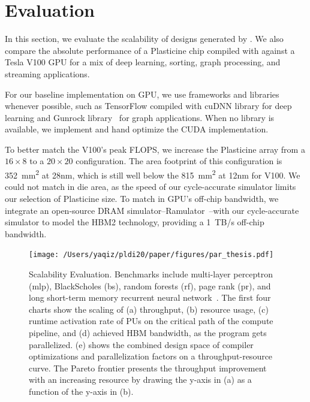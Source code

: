 \section{Evaluation} \label{sec:eval}

In this section, we evaluate the scalability of designs generated by \name.
We also compare the absolute performance of a Plasticine chip compiled with \name against a Tesla V100 GPU 
for a mix of deep learning, sorting, graph processing, and streaming applications.

For our baseline implementation on GPU, we use frameworks and libraries whenever possible, such as TensorFlow compiled
with cuDNN library for deep learning and Gunrock library~\cite{gunrock} for graph applications.
When no library is available, we implement and hand optimize the CUDA implementation.

To better match the V100's peak FLOPS, 
we increase the Plasticine array from a $16\times8$ to a $20\times20$ configuration.
The area footprint of this configuration is \SI{352}{mm^2} at 28nm, which is still well below the 
\SI{815}{mm^2} at 12nm for V100.
We could not match in die area, as the speed of our cycle-accurate simulator limits our selection of Plasticine size.
To match in GPU's off-chip bandwidth, 
we integrate an open-source DRAM simulator--Ramulator~\cite{ramulator}--with our
cycle-accurate simulator to model the HBM2 technology, providing a \SI{1}{TB/s} off-chip bandwidth.

\begin{figure}
\centering
\texttt{[image: /Users/yaqiz/pldi20/paper/figures/par\_thesis.pdf]}
\caption[Scalability Evaluation]{
  Scalability Evaluation. 
  Benchmarks include multi-layer perceptron (mlp), BlackScholes (bs), random forests (rf), page rank
  (pr), and long short-term memory recurrent neural network~\cite{hochreiter1997long}.
  The first four charts show the scaling of
  (a) throughput, 
  (b) resource usage, 
  (c) runtime activation rate of PUs on the critical path of the compute pipeline, 
  and (d) achieved HBM bandwidth, as the program gets parallelized.
  (e) shows the combined design space of compiler optimizations and parallelization factors on a
  throughput-resource curve. 
  The Pareto frontier presents the throughput improvement with an increasing resource by drawing the y-axis in (a) as a function of the y-axis in (b).
}
\label{fig:par}
\end{figure}

